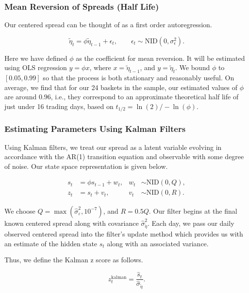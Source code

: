 \documentclass[12pt]{article}
\begin{document}
\subsubsection{Mean Reversion of Spreads (Half Life)}

Our centered spread can be thought of as a first order autoregression.

\begin{equation}
\tilde{\eta}_t = \phi \tilde{\eta}_{t-1} + \epsilon_t,
\qquad \epsilon_t \sim \text{NID}(0, \sigma^2_\epsilon).
\end{equation}

Here we have defined $\phi$ as the coefficient for mean reversion. It will be estimated using OLS regression $y = \phi x$, where $x = \tilde{\eta}_{t-1}$, and $y = \tilde{\eta}_t$. We bound $\phi$ to $[0.05, 0.99]$ so that the process is both stationary and reasonably useful. On average, we find that for our 24 baskets in the sample, our estimated values of $\phi$ are around $0.96$, i.e., they correspond to an approximate theoretical half life of just under 16 trading days, based on $t_{1/2} = \ln(2) / -\ln(\phi)$.

\subsubsection{Estimating Parameters Using Kalman Filters}

Using Kalman filters, we treat our spread as a latent variable evolving in accordance with the AR(1) transition equation and observable with some degree of noise. Our state space representation is given below.

\begin{align}
s_t &= \phi s_{t-1} + w_t,
& w_t &\sim \text{NID}(0,Q), \\
z_t &= s_t + v_t,
& v_t &\sim \text{NID}(0,R).
\end{align}

We choose $Q = \max(\hat{\sigma}^2_\varepsilon, 10^{-7})$, and $R = 0.5Q$. Our filter begins at the final known centered spread along with covariance $\hat{\sigma}^2_{\tilde{\eta}}$. Each day, we pass our daily observed centered spread into the filter's update method which provides us with an estimate of the hidden state $s_t$ along with an associated variance.

Thus, we define the Kalman z score as follows.

\begin{equation}
z_t^{\text{kalman}} = \frac{\hat{s}_t}{\hat{\sigma}_{\tilde{\eta}}}.
\end{equation}
\end{document}
